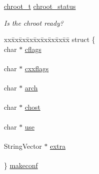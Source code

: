 \begin{DoxyCompactItemize}
\mbox{\hyperlink{host_8h_a54b3a4fa9f2eb80339d743f0152bc293}{chroot\+\_\+t}} \mbox{\hyperlink{struct_____host_a6f57f709b8074f8d231036b94806aff7}{chroot\+\_\+status}}
\begin{DoxyCompactList}\small\item\em Is the chroot ready? \end{DoxyCompactList}\item 
\begin{tabbing}
xx\=xx\=xx\=xx\=xx\=xx\=xx\=xx\=xx\=\kill
struct \{\\
\>char $\ast$ \mbox{\hyperlink{struct_____host_a94121a0033331d7cdf5425e6d97a74ca}{cflags}}\\
\>\\
\>char $\ast$ \mbox{\hyperlink{struct_____host_ae241a5f7a25f297926c85a06c4b11c1d}{cxxflags}}\\
\>\\
\>char $\ast$ \mbox{\hyperlink{struct_____host_a781364a501280f6632f702fc1dceb8e4}{arch}}\\
\>\\
\>char $\ast$ \mbox{\hyperlink{struct_____host_a73ffa5f9a5dbc9e987f5d804ebc320fa}{chost}}\\
\>\\
\>char $\ast$ \mbox{\hyperlink{struct_____host_a29d2f3a317a102944ed07955038d827c}{use}}\\
\>\\
\>StringVector $\ast$ \mbox{\hyperlink{struct_____host_a7b6efbb413eb628ad363c5557da00796}{extra}}\\
\>\\
\} \mbox{\hyperlink{struct_____host_a5dbb399641e9722e0250871091751972}{makeconf}}\\


\end{tabbing}
\end{DoxyCompactItemize}
